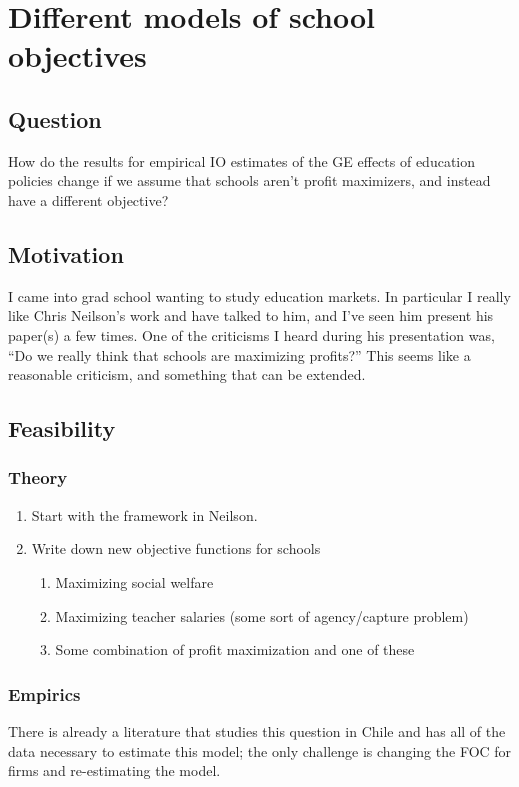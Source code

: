 \documentclass[dvipsnames]{article}
\begin{document}
  \section{Different models of school objectives}
  \subsection{Question}
  How do the results for empirical IO estimates of the GE effects of education policies change if we assume that schools aren't profit maximizers, and instead have a different objective?
  \subsection{Motivation}
  I came into grad school wanting to study education markets. In particular I really like Chris Neilson's work and have talked to him, and I've seen him present his paper(s) a few times. One of the criticisms I heard during his presentation was, ``Do we really think that schools are maximizing profits?'' This seems like a reasonable criticism, and something that can be extended.
  \subsection{Feasibility}
  \subsubsection{Theory}
  \begin{enumerate}
  \item Start with the framework in Neilson.
  \item Write down new objective functions for schools
    \begin{enumerate}
    \item Maximizing social welfare
    \item Maximizing teacher salaries (some sort of agency/capture problem)
      \item Some combination of profit maximization and one of these
    \end{enumerate}
  \end{enumerate}
  \subsubsection{Empirics}
  There is already a literature that studies this question in Chile and has all of the data necessary to estimate this model; the only challenge is changing the FOC for firms and re-estimating the model.
\end{document}
